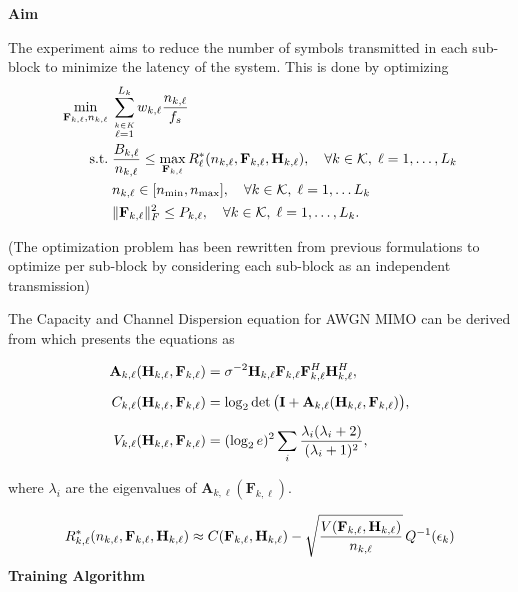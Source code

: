 \documentclass[a4paper, 12pt, onecolumn, journal, twoside, draftclsnofoot]{IEEEtran}
\begin{document}
\textbf{Aim}

The experiment aims to reduce the number of symbols transmitted in each sub-block
to minimize the latency of the system. This is done by optimizing
\begin{equation*}
	\begin{split}
		\min_{{\bf F}_{k,\ell}, n_{k,\ell}} \;& \sum_{\stackrel {k \in K} {\ell =1}}^{L_k} w_{k,\ell} \frac{n_{k,\ell}}{f_s} \\
		\text{s.t.}\;& \frac{B_{k,\ell}}{n_{k,\ell}} \leq \max_{{\bf F}_{k, \ell}} R^*_\ell(n_{k,\ell}, {\bf F}_{k, \ell},  {\bf H}_{k,\ell}), \quad \forall k \in { \mathcal{K} }, \; \ell = 1, \ldots, L_k \\ 
		& n_{k,\ell} \in [n_{\text{min}}, n_{\text{max}}], \quad \forall k \in { \mathcal{K} }, \; \ell = 1, \ldots L_k \\
		& \|{\bf F}_{k,\ell}\|_F^2 \leq P_{k,\ell}, \quad \forall k \in { \mathcal{K} }, \; \ell = 1, \ldots, L_k. 
	\end{split}
\end{equation*}


(The optimization problem has been rewritten from previous formulations to optimize per sub-block by considering each sub-block as an independent transmission)

The Capacity and Channel Dispersion equation for AWGN MIMO can be derived from \cite{yuri2010} which presents the equations as

\begin{equation}
\begin{aligned}
\mathbf{A}_{k,\ell}({\bf H}_{k,\ell},\mathbf{F}_{k,\ell})
&=
\sigma^{-2}
\mathbf{H}_{k,\ell}
\mathbf{F}_{k,\ell}
\mathbf{F}_{k,\ell}^H
\mathbf{H}_{k,\ell}^H, \\[2mm]
C_{k,\ell}({\bf H}_{k,\ell}, \mathbf{F}_{k,\ell})
&=
\log_2 \det \big(
\mathbf{I}
+
\mathbf{A}_{k,\ell}({\bf H}_{k,\ell},\mathbf{F}_{k,\ell})
\big), \\[2mm]
V_{k,\ell}({\bf H}_{k,\ell}, \mathbf{F}_{k,\ell})
&=
(\log_2 e)^2
\sum_i
\frac{\lambda_i (\lambda_i + 2)}{(\lambda_i + 1)^2},
\end{aligned}
\label{eq:capacity_dispersion}
\end{equation}

where $\lambda_i$ are the eigenvalues of $\mathbf{A}_{k,\ell}(\mathbf{F}_{k,\ell})$.

\begin{equation*}
	R^*_{k,\ell}(n_{k,\ell}, {\bf F}_{k,\ell}, {\bf H}_{k,\ell}) \approx C({\bf F}_{k,\ell}, {\bf H}_{k,\ell}) - \sqrt{\frac{V({\bf F}_{k,\ell}, {\bf H}_{k,\ell})}{n_{k,\ell}}} \, Q^{-1}(\epsilon_{k})
\end{equation*}
\textbf{Training Algorithm}
\end{document}
